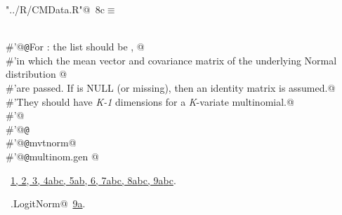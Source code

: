 \documentclass[reqno]{amsart}
\renewcommand{\NWtarget}[2]{\hypertarget{#1}{#2}}
\renewcommand{\NWlink}[2]{\hyperlink{#1}{#2}}
\begin{document}
\begin{flushleft} \small\label{scrap15}\raggedright\small
\NWtarget{nuweb8c}{} \verb@"../R/CMData.R"@\nobreak\ {\footnotesize {8c}}$\equiv$
\vspace{-1ex}
\begin{list}{}{} \item
\mbox{}\verb@@\\
\mbox{}\verb@#'@{\tt @}\verb@details For : the  list should be , @\\
\mbox{}\verb@#'in which the mean vector and covariance matrix of the underlying Normal distribution @\\
\mbox{}\verb@#'are passed. If  is NULL (or missing), then an identity matrix is assumed.@\\
\mbox{}\verb@#'They should have \emph{K-1} dimensions for a \emph{K}-variate multinomial.@\\
\mbox{}\verb@#'@\\
\mbox{}\verb@#'@{\tt @}\verb@export@\\
\mbox{}\verb@#'@{\tt @}\verb@import mvtnorm@\\
\mbox{}\verb@#'@{\tt @}\verb@rdname multinom.gen @\\
\mbox{}\verb@@{\NWsep}
\end{list}
\vspace{-1.5ex}
\footnotesize
\begin{list}{}{\setlength{\itemsep}{-\parsep}\setlength{\itemindent}{-\leftmargin}}
\item \NWtxtFileDefBy\ \NWlink{nuweb1}{1}\NWlink{nuweb2}{, 2}\NWlink{nuweb3}{, 3}\NWlink{nuweb4a}{, 4a}\NWlink{nuweb4b}{b}\NWlink{nuweb4c}{c}\NWlink{nuweb5a}{, 5a}\NWlink{nuweb5b}{b}\NWlink{nuweb6}{, 6}\NWlink{nuweb7a}{, 7a}\NWlink{nuweb7b}{b}\NWlink{nuweb7c}{c}\NWlink{nuweb8a}{, 8a}\NWlink{nuweb8b}{b}\NWlink{nuweb8c}{c}\NWlink{nuweb9a}{, 9a}\NWlink{nuweb9b}{b}\NWlink{nuweb9c}{c}.
\item \NWtxtIdentsUsed\nobreak\  \verb@mg.LogitNorm@\nobreak\ \NWlink{nuweb9a}{9a}.
\item{}
\end{list}
\vspace{4ex}
\end{flushleft}
\end{document}
